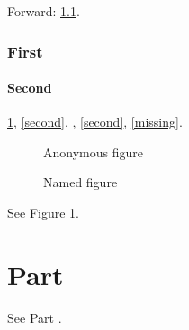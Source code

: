 Forward: \ref{second}.

\section{First}\label{first}
\subsection{Second}\label{second}

\ref{first}, \autoref{second}, , \eqref{second}, \ref{missing}.

\begin{figure}
\caption{Anonymous figure}
\end{figure}

\begin{figure}
\caption{Named figure}
\label{figure}
\end{figure}

See Figure \ref{figure}.

\part{Part}\label{part}

See Part \ref{part}.
